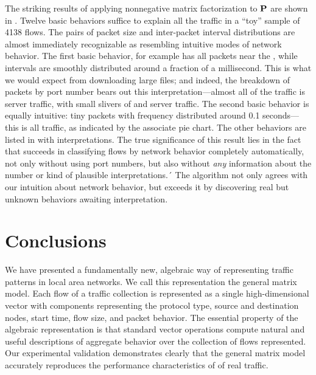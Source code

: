 \documentclass[twocolumn,final]{svjour3}
\begin{document}
The striking results of applying nonnegative matrix factorization to $\mathbf{P}$ are shown in . Twelve basic behaviors suffice to explain all the traffic in a ``toy''  sample of 4138 flows. The pairs of packet size and inter-packet interval distributions are almost immediately recognizable as resembling intuitive modes of network behavior. The first basic behavior, for example has all packets near the , while intervals are smoothly distributed around a fraction of a millisecond. This is what we would expect from downloading large files; and indeed, the breakdown of packets by port number bears out this interpretation---almost all of the traffic is  server traffic, with small slivers of  and  server traffic. The second basic behavior is equally intuitive: tiny packets with frequency distributed around 0.1 seconds---this is all  traffic, as indicated by the associate pie chart.
The other behaviors are listed in  with interpretations.
The true significance of this result lies in the fact that  succeeds in classifying flows by network behavior completely automatically, not only without using port numbers, but also without \emph{any} information about the number or kind of plausible interpretations.´
The algorithm not only agrees with our intuition about network behavior, but exceeds it by discovering real but unknown behaviors awaiting interpretation.



\section{Conclusions}\label{sec:conclusions}

We have presented a fundamentally new, algebraic way of representing traffic patterns in local area networks. We call this representation the general matrix model. Each flow of a traffic collection is represented as a single high-dimensional vector with components representing the  protocol type, source and destination nodes, start time, flow size, and packet behavior. The essential property of the algebraic representation is that standard vector operations compute natural and useful descriptions of aggregate behavior over the collection of flows represented. Our experimental validation demonstrates clearly that the general matrix model accurately reproduces the performance characteristics of of real traffic.
\end{document}
